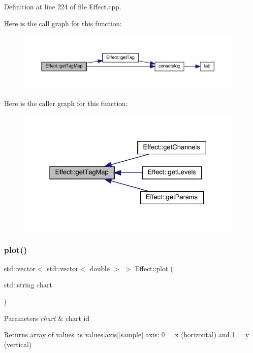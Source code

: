 Definition at line 224 of file Effect.\+cpp.

Here is the call graph for this function\+:
\nopagebreak
\begin{figure}[H]
\begin{center}
\leavevmode
\includegraphics[width=350pt]{class_effect_a616281286b866f1f8f6c66715e54ee89_cgraph}
\end{center}
\end{figure}
Here is the caller graph for this function\+:
\nopagebreak
\begin{figure}[H]
\begin{center}
\leavevmode
\includegraphics[width=318pt]{class_effect_a616281286b866f1f8f6c66715e54ee89_icgraph}
\end{center}
\end{figure}
\mbox{\label{class_effect_ac2c35ce7382d627f20879b44be0e8132}} 
\subsubsection{\texorpdfstring{plot()}{plot()}}
{\footnotesize\ttfamily std\+::vector$<$ std\+::vector$<$ double $>$ $>$ Effect\+::plot (\begin{DoxyParamCaption}\item[{std\+::string}]{chart }\end{DoxyParamCaption})}


\begin{DoxyParams}{Parameters}
{\em chart} & chart id \\
\hline
\end{DoxyParams}
\begin{DoxyReturn}{Returns}
array of values as values\mbox{[}axis\mbox{]}\mbox{[}sample\mbox{]} axis\+: 0 = x (horizontal) and 1 = y (vertical) 
\end{DoxyReturn}


